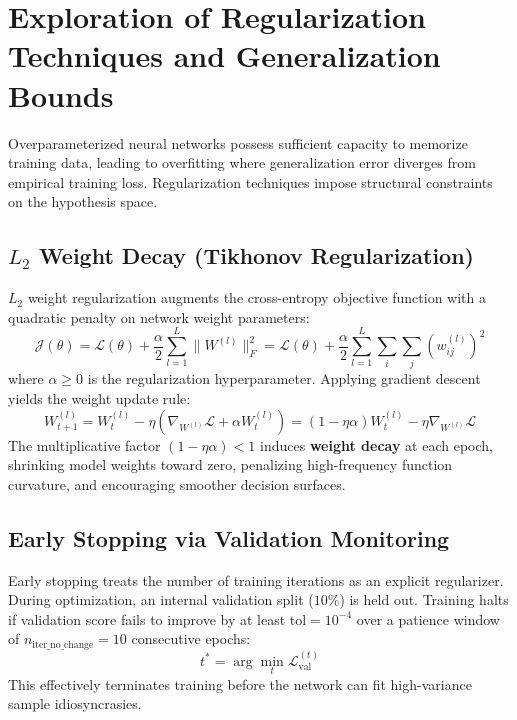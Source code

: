 \documentclass[12pt]{article}
\begin{document}
\section{Exploration of Regularization Techniques and Generalization Bounds}

Overparameterized neural networks possess sufficient capacity to memorize training data, leading to overfitting where generalization error diverges from empirical training loss. Regularization techniques impose structural constraints on the hypothesis space.

\subsection{$L_2$ Weight Decay (Tikhonov Regularization)}
$L_2$ weight regularization augments the cross-entropy objective function with a quadratic penalty on network weight parameters:
\begin{equation}
\mathcal{J}(\theta) = \mathcal{L}(\theta) + \frac{\alpha}{2} \sum_{l=1}^L \|W^{(l)}\|_F^2 = \mathcal{L}(\theta) + \frac{\alpha}{2} \sum_{l=1}^L \sum_{i} \sum_{j} (w_{ij}^{(l)})^2
\end{equation}
where $\alpha \ge 0$ is the regularization hyperparameter. Applying gradient descent yields the weight update rule:
\begin{equation}
W^{(l)}_{t+1} = W^{(l)}_t - \eta \left( \nabla_{W^{(l)}} \mathcal{L} + \alpha W^{(l)}_t \right) = (1 - \eta \alpha) W^{(l)}_t - \eta \nabla_{W^{(l)}} \mathcal{L}
\end{equation}
The multiplicative factor $(1 - \eta \alpha) < 1$ induces \textbf{weight decay} at each epoch, shrinking model weights toward zero, penalizing high-frequency function curvature, and encouraging smoother decision surfaces.

\subsection{Early Stopping via Validation Monitoring}
Early stopping treats the number of training iterations as an explicit regularizer. During optimization, an internal validation split ($10\%$) is held out. Training halts if validation score fails to improve by at least $\text{tol} = 10^{-4}$ over a patience window of $n_{\text{iter\_no\_change}} = 10$ consecutive epochs:
\begin{equation}
t^* = \arg\min_t \mathcal{L}_{\text{val}}^{(t)}
\end{equation}
This effectively terminates training before the network can fit high-variance sample idiosyncrasies.
\end{document}

